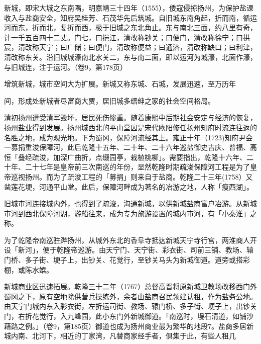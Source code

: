 新城，即宋大城之东南隅，明嘉靖三十四年（1555），倭寇侵掠扬州，为保护盐课收入与盐商安全，知府吴桂芳、石茂华先后筑城。自旧城东南角起，折而南，循运河而东，折而北，复折而西，极于旧城之东北角止。东与南北三面，约八里有奇，计一千五百四十二丈。门七，曰挹江，清改称钞关；曰便门，清改称徐宁；曰拱宸，清改称天宁；曰广储；曰便门，清改称便益；曰通济，清改称缺口；曰利津，清改称东关。沿旧城城濠南北水关二，东与南二面，即以运河为城濠，北面作濠，与旧城连，注于运河。（卷9，第178页）

增筑新城，城市空间大为扩展。新城又称东城、石城，发展迅速，至万历年

\vfill
\begin{BookNotes}
\end{BookNotes}

\noindent 间，形成处新城者尽富商大贾，居旧城多缙绅之家的社会空间格局。

清初扬州遭受清军毁坏，居民死伤惨重。随着康熙中后期社会安定与经济的恢复，扬州盐业得到发展。扬州城西北的平山堂因是宋代欧阳修任扬州知府时流连往返的名胜之地，成为观光地。下为蜀冈，保障河流经其上。雍正十年（1723)知府尹会一募捐重浚保障河，此后乾隆十五年、二十年、二十六年巡盐御史吉庆、普福、高恒「叠经疏浚，加深广曲折，点缀园亭，栽植桃柳」。需要指出，乾隆十六年、二十年、二十七年是皇帝前三次南巡的年份，显然乾隆时期疏浚保障河工程是为了皇帝巡视扬州。而为了疏浚工程的「募捐」则来自于盐商。乾隆二十三年(1758）又凿莲花埂，河通平山堂。此后，保障河畔成为著名的冶游之地，人称「瘦西湖」。

旧城市河连接城内外，也得到了疏浚，沟通新城，以供新城盐商富户冶游。从新城市河到西北保障河湖，游船往来，成为专为旅游设置的城内市河，有「小秦淮」之称。

为了乾隆帝南巡驻跸扬州，从城外东北的香阜寺抵达新城天宁寺行宫，两淮商人开设「新河」，便于乾隆帝巡游。由天宁门、天宁街、彩衣街、司前三铺、教场、辕门桥、多子街、埂子上，出钞关、花觉行，至钞关马头为新城御道。道旁或搭彩棚，或陈水嬉。

新城商业区迅速拓展。乾隆三十二年（1767）总督高晋将原新城卫教场改移西门外蜀冈之下，原有空地除供营兵操练外，余者由盐商召民领建认租，作为盐务公地。由天宁门城内东入彩衣街，左折运司街、教场、辕门桥、多子街、埂子上，出钞关门，右折花觉行，入九峰园，此小东门外新城御道。「南巡时，墁石清道，如铺沙藉路之例。」（卷9，第185页）御道也成为扬州商业最为繁华的地段7。盐商多居新城内南、北河下，相近的丁家湾，凡替商家经手者，俱集于此，有些人租几

